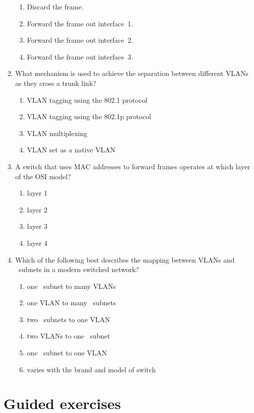 \begin{enumerate}
\begin{enumerate}
   \item Discard the frame.
   \item Forward the frame out interface~1.
   \item Forward the frame out interface~2.
   \item Forward the frame out interface~3.
   \end{enumerate}
\item
   What mechanism is used to achieve the separation between different \acsp{VLAN} as they cross a trunk link?
   \begin{enumerate}
      \item \acs{VLAN} tagging using the 802.1 protocol
      \item \acs{VLAN} tagging using the 802.1p protocol
      \item \acs{VLAN} multiplexing
      \item \acs{VLAN} set as a native \acs{VLAN}
   \end{enumerate}
\item
   A switch that uses \acs{MAC} addresses to forward frames operates at which layer of the \acs{OSI} model?
   \begin{enumerate}
      \item layer 1
      \item layer 2
      \item layer 3
      \item layer 4
   \end{enumerate}
\item
   Which of the following best describes the mapping between \acsp{VLAN} and \IP\ subnets in a modern switched network?
   \begin{enumerate}
      \item one \IP\ subnet to many \acsp{VLAN}
      \item one \acs{VLAN} to many \IP\ subnets
      \item two \IP\ subnets to one \acs{VLAN}
      \item two \acsp{VLAN} to one \IP\ subnet
      \item one \IP\ subnet to one \acs{VLAN}
      \item varies with the brand and model of switch
   \end{enumerate}
\end{enumerate}



\section{Guided exercises}
\label{sec:ethernet-guided-exercises}

